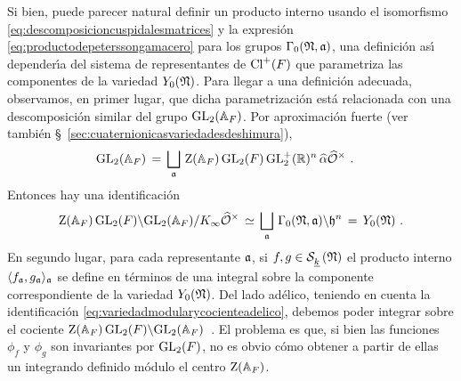 Si bien, puede parecer natural definir un producto interno usando el
isomorfismo \eqref{eq:descomposicioncuspidalesmatrices} y la expresi\'{o}n
\eqref{eq:productodepeterssongamacero} para los grupos
$\Gamma_{0}(\frak{N},\frak{a})$, una definici\'{o}n as\'{\i} depender\'{\i}a
del sistema de representantes de $\pClass{F}$ que parametriza las componentes
de la variedad $Y_{0}(\frak{N})$. Para llegar a una definici\'{o}n adecuada,
observamos, en primer lugar, que dicha parametrizaci\'{o}n est\'{a} relacionada
con una descomposici\'{o}n similar del grupo $\GL_{2}(\adeles{F})$. Por
aproximaci\'{o}n fuerte (ver tambi\'{e}n
\S~\ref{sec:cuaternionicasvariedadesdeshimura}),
\begin{align*}
	\GL_{2}(\adeles{F}) & \,=\,\bigsqcup_{\frak{a}}\,\centre(\adeles{F})\,
		\GL_{2}(F)\,\GLtp_{2}(\bb{R})^{n}\,\hhat{\alpha}\Idfin{\cal{O}}
	\text{ .}
\end{align*}
%
Entonces hay una identificaci\'{o}n
\begin{equation}
	\label{eq:variedadmodularycocienteadelico}
	\centre(\adeles{F})\,\GL_{2}(F)\backslash\GL_{2}(\adeles{F})/
		K_{\infty}\Idfin{\cal{O}} \,\simeq\,\bigsqcup_{\frak{a}}\,
			\Gamma_{0}(\frak{N},\frak{a})\backslash\hP^{n}
		\,=\,Y_{0}(\frak{N})
	\text{ .}
\end{equation}
%
En segundo lugar, para cada representante $\frak{a}$, si
$f,g\in\spitzH{k}{\frak{N}}$ el producto interno
$\langle f_{\frak{a}},g_{\frak{a}}\rangle_{\frak{a}}$ se define en t\'{e}rminos
de una integral sobre la componente correspondiente de la variedad
$Y_{0}(\frak{N})$. Del lado ad\'{e}lico, teniendo en cuenta la
identificaci\'{o}n \eqref{eq:variedadmodularycocienteadelico}, debemos poder
integrar sobre el cociente
\begin{math}
	\centre(\adeles{F})\,\GL_{2}(F)\backslash\GL_{2}(\adeles{F})
\end{math}~.
El problema es que, si bien las funciones $\phi_{f}$ y $\phi_{g}$ son
invariantes por $\GL_{2}(F)$, no es obvio c\'{o}mo obtener a partir de ellas un
integrando definido m\'{o}dulo el centro $\centre(\adeles{F})$.

